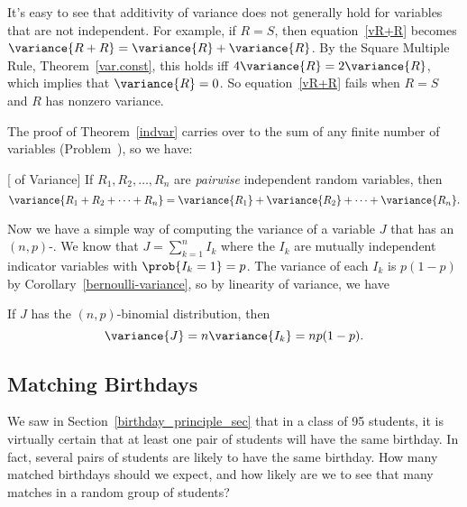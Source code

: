 It's easy to see that additivity of variance does not generally hold
for variables that are not independent.  For example, if $R=S$,
then equation~\eqref{vR+R} becomes $\variance{R + R} =
\variance{R} + \variance{R}$.  By the Square Multiple Rule,
Theorem~\ref{var.const}, this holds iff $4 \variance{R} = 2
\variance{R}$, which implies that $\variance{R}=0$.  So
equation~\eqref{vR+R} fails when $R=S$ and $R$ has nonzero
variance.

The proof of Theorem~\ref{indvar} carries over to the sum of any
finite number of variables (Problem~), so
we have:

\begin{theorem}\label{thm:variance_additivity}
[ of Variance] If $R_1, R_2,
\dots, R_n$ are  \emph{pairwise}
independent random variables, then
\begin{equation}\label{vsum}
\variance{R_1 + R_2 + \cdots + R_n} = \variance{R_1} + \variance{R_2} +
  \cdots + \variance{R_n}.
\end{equation}
\end{theorem}

Now we have a simple way of computing the variance of a variable $J$
that has an $(n,p)$-.  We know that $J =
\sum_{k=1}^n I_k$ where the $I_k$ are mutually independent indicator
variables with $\prob{I_k=1}=p$.  The variance of each $I_k$ is $p(1-p)$
by Corollary~\ref{bernoulli-variance}, so by linearity of variance, we have
\begin{lemma}
If $J$ has the $(n,p)$-binomial distribution, then
\begin{equation}\label{eq:binom-var}
\variance{J} = n \variance{I_k} = np(1-p).
\end{equation}
\end{lemma}

\subsection{Matching Birthdays}\label{bday_deviation_subsec}

\iffalse
There are important cases where the relevant distributions are not
binomial because the mutual independence properties of the voter
preference example do not hold.  In these cases, estimation methods
based on Chebyshev's Theorem may be the best approach.  Birthday
Matching is an example.\fi

We saw in Section~\ref{birthday_principle_sec} that in a class of 95
students, it is virtually certain that at least one pair of students
will have the same birthday.  In fact, several pairs of students are
likely to have the same birthday.  How many matched birthdays should
we expect, and how likely are we to see that many matches in a random
group of students?

